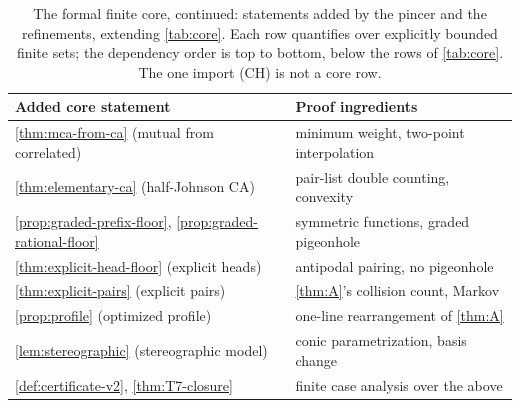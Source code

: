 \documentclass[11pt]{article}
\theoremstyle{definition}
\theoremstyle{remark}
\begin{document}
\begin{table}[ht]
\centering
\small
\begin{tabular}{@{}ll@{}}
\toprule
Added core statement & Proof ingredients \\
\midrule
\cref{thm:mca-from-ca} \textup(mutual from correlated\textup) & minimum weight, two-point interpolation \\
\cref{thm:elementary-ca} \textup(half-Johnson CA\textup) & pair-list double counting, convexity \\
\cref{prop:graded-prefix-floor}, \cref{prop:graded-rational-floor} & symmetric functions, graded pigeonhole \\
\cref{thm:explicit-head-floor} \textup(explicit heads\textup) & antipodal pairing, no pigeonhole \\
\cref{thm:explicit-pairs} \textup(explicit pairs\textup) & \cref{thm:A}'s collision count, Markov \\
\cref{prop:profile} \textup(optimized profile\textup) & one-line rearrangement of \cref{thm:A} \\
\cref{lem:stereographic} \textup(stereographic model\textup) & conic parametrization, basis change \\
\cref{def:certificate-v2}, \cref{thm:T7-closure} & finite case analysis over the above \\
\bottomrule
\end{tabular}
\caption{The formal finite core, continued: statements added by the pincer and the refinements, extending \cref{tab:core}. Each row quantifies over explicitly bounded finite sets; the dependency order is top to bottom, below the rows of \cref{tab:core}. The one import (\textsc{CH}) is not a core row.}
\label{tab:core2}
\end{table}
\end{document}
